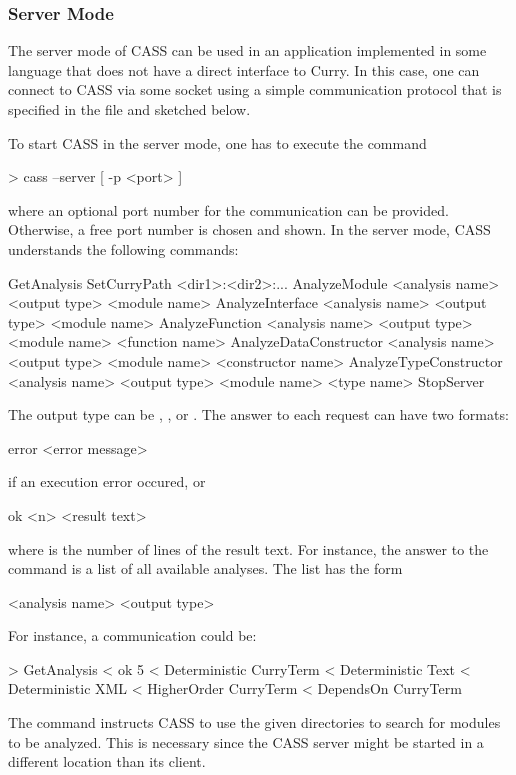 \subsubsection{Server Mode}

The server mode of CASS can be used in an application implemented in
some language that does not have a direct interface to Curry.
In this case, one can connect to CASS via
some socket using a simple communication protocol that is specified
in the file  and sketched below.

To start CASS in the server mode, one has to execute the command
\begin{curry}
> cass --server [ -p <port> ]
\end{curry}
where an optional port number for the communication can be
provided. Otherwise, a free port number is chosen and shown. In the
server mode, CASS understands the following commands:
\begin{curry}
GetAnalysis
SetCurryPath <dir1>:<dir2>:...
AnalyzeModule          <analysis name> <output type> <module name>
AnalyzeInterface       <analysis name> <output type> <module name>
AnalyzeFunction        <analysis name> <output type> <module name> <function name>
AnalyzeDataConstructor <analysis name> <output type> <module name> <constructor name>
AnalyzeTypeConstructor <analysis name> <output type> <module name> <type name>
StopServer
\end{curry}
The output type can be , , or .
The answer to each request can have two formats:
\begin{curry}
error <error message>
\end{curry}
if an execution error occured, or
\begin{curry}
ok <n>
<result text>
\end{curry}
where  is the number of lines of the result text.
For instance, the answer to the command 
is a list of all available analyses. The list has the form
\begin{curry}
<analysis name> <output type>
\end{curry}
For instance, a communication could be:
\begin{curry}
> GetAnalysis
< ok 5
< Deterministic CurryTerm
< Deterministic Text
< Deterministic XML
< HigherOrder   CurryTerm
< DependsOn     CurryTerm
\end{curry}
The command  instructs CASS to use the given
directories to search for modules to be analyzed. This is necessary
since the CASS server might be started in a different location than
its client.

